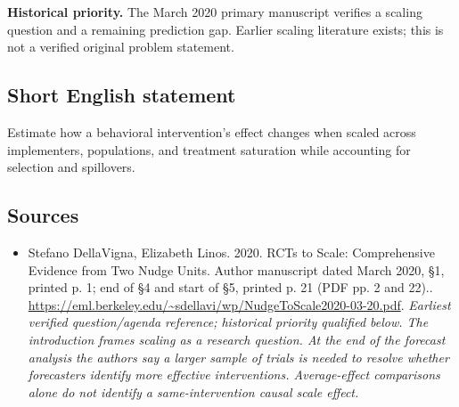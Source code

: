 \documentclass[11pt]{article}
\begin{document}
\par\textbf{Historical priority.} The March 2020 primary manuscript verifies a scaling question and a remaining prediction gap. Earlier scaling literature exists; this is not a verified original problem statement.

\subsection{Short English statement}
Estimate how a behavioral intervention’s effect changes when scaled across implementers, populations, and treatment saturation while accounting for selection and spillovers.

\subsection{Sources}
\begin{itemize}\raggedright
\item[\textnormal{[S1]}]\hypertarget{source:30007590:1}{} Stefano DellaVigna, Elizabeth Linos. 2020. RCTs to Scale: Comprehensive Evidence from Two Nudge Units. Author manuscript dated March 2020, §1, printed p. 1; end of §4 and start of §5, printed p. 21 (PDF pp. 2 and 22)..
\url{https://eml.berkeley.edu/~sdellavi/wp/NudgeToScale2020-03-20.pdf}.
{\small\textit{Earliest verified question/agenda reference; historical priority qualified below. The introduction frames scaling as a research question. At the end of the forecast analysis the authors say a larger sample of trials is needed to resolve whether forecasters identify more effective interventions. Average-effect comparisons alone do not identify a same-intervention causal scale effect.}}
\end{itemize}
\end{document}
